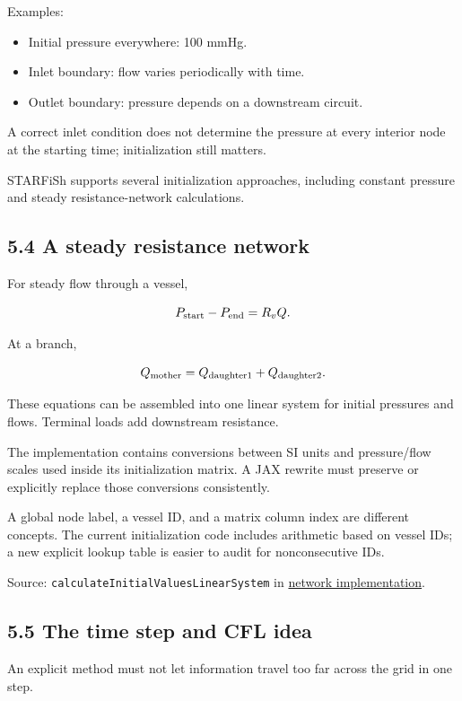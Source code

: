 \documentclass[11pt,a4paper]{article}
\begin{document}
Examples:


\begin{itemize}
\item Initial pressure everywhere: 100 mmHg.


\item Inlet boundary: flow varies periodically with time.


\item Outlet boundary: pressure depends on a downstream circuit.


\end{itemize}
A correct inlet condition does not determine the pressure at every interior node at the starting time; initialization still matters.

STARFiSh supports several initialization approaches, including constant pressure and steady resistance-network calculations.

\subsection{5.4 A steady resistance network}
For steady flow through a vessel,


\begingroup\small
\[
P_{\rm start}-P_{\rm end}=R_v Q.
\]
\endgroup


At a branch,


\begingroup\small
\[
Q_{\rm mother}=Q_{\rm daughter1}+Q_{\rm daughter2}.
\]
\endgroup


These equations can be assembled into one linear system for initial pressures and flows. Terminal loads add downstream resistance.

The implementation contains conversions between SI units and pressure/flow scales used inside its initialization matrix. A JAX rewrite must preserve or explicitly replace those conversions consistently.

A global node label, a vessel ID, and a matrix column index are different concepts. The current initialization code includes arithmetic based on vessel IDs; a new explicit lookup table is easier to audit for nonconsecutive IDs.

Source: \texttt{calculateInitialValuesLinearSystem} in \href{/home/sadid/starfish/NetworkLib/classVascularNetwork.py}{network implementation}.

\subsection{5.5 The time step and CFL idea}
An explicit method must not let information travel too far across the grid in one step.
\end{document}
